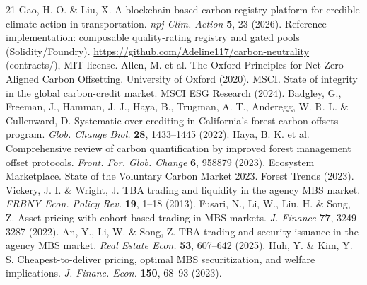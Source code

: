 \documentclass[12pt,a4paper]{article}
\begin{document}
\begin{thebibliography}{21}
 Gao, H. O. \& Liu, X. A blockchain-based carbon registry platform for credible climate action in transportation. \textit{npj Clim. Action} \textbf{5}, 23 (2026).
 Reference implementation: composable quality-rating registry and gated pools (Solidity/Foundry). \url{https://github.com/Adeline117/carbon-neutrality} (contracts/), MIT license.
 Allen, M. et al. The Oxford Principles for Net Zero Aligned Carbon Offsetting. University of Oxford (2020).
 MSCI. State of integrity in the global carbon-credit market. MSCI ESG Research (2024).
 Badgley, G., Freeman, J., Hamman, J. J., Haya, B., Trugman, A. T., Anderegg, W. R. L. \& Cullenward, D. Systematic over-crediting in California's forest carbon offsets program. \textit{Glob. Change Biol.} \textbf{28}, 1433--1445 (2022).
 Haya, B. K. et al. Comprehensive review of carbon quantification by improved forest management offset protocols. \textit{Front. For. Glob. Change} \textbf{6}, 958879 (2023).
 Ecosystem Marketplace. State of the Voluntary Carbon Market 2023. Forest Trends (2023).
 Vickery, J. I. \& Wright, J. TBA trading and liquidity in the agency MBS market. \textit{FRBNY Econ. Policy Rev.} \textbf{19}, 1--18 (2013).
 Fusari, N., Li, W., Liu, H. \& Song, Z. Asset pricing with cohort-based trading in MBS markets. \textit{J. Finance} \textbf{77}, 3249--3287 (2022).
 An, Y., Li, W. \& Song, Z. TBA trading and security issuance in the agency MBS market. \textit{Real Estate Econ.} \textbf{53}, 607--642 (2025).
 Huh, Y. \& Kim, Y. S. Cheapest-to-deliver pricing, optimal MBS securitization, and welfare implications. \textit{J. Financ. Econ.} \textbf{150}, 68--93 (2023).
\end{thebibliography}
\end{document}
